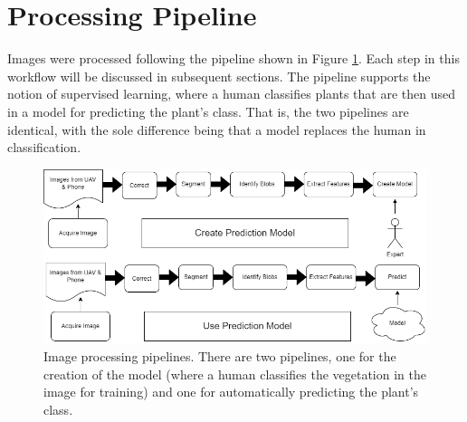 \documentclass[letterpaper, notitlepage]{report}
\begin{document}
\section{Processing Pipeline}
Images were processed following the pipeline shown in Figure \ref{fig:workflow}. Each step in this workflow will be discussed in subsequent sections. The pipeline supports the notion of supervised learning, where a human classifies plants that are then used in a model for predicting the plant's class. That is, the two pipelines are identical, with the sole difference being that a model replaces the human in classification. 
\begin{figure}[H]
	\centering
	\includegraphics[width=0.85\linewidth]{./figures/workflow.png}
	\caption[Image processing workflow]{Image processing pipelines. There are two pipelines, one for the creation of the model (where a human classifies the vegetation in the image for training) and one for automatically predicting the plant’s class.}
	\label{fig:workflow}	
\end{figure}
\end{document}

